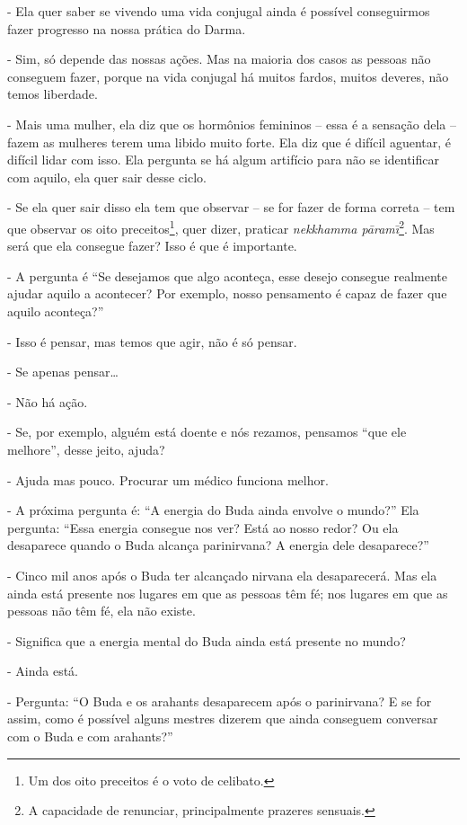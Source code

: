 - Ela quer saber se vivendo uma vida conjugal ainda é possível
conseguirmos fazer progresso na nossa prática do Darma.

- Sim, só depende das nossas ações. Mas na maioria dos casos as
pessoas não conseguem fazer, porque na vida conjugal há muitos fardos,
muitos deveres, não temos liberdade.

- Mais uma mulher, ela diz que os hormônios femininos – essa é a
sensação dela – fazem as mulheres terem uma libido muito forte. Ela diz
que é difícil aguentar, é difícil lidar com isso. Ela pergunta se há
algum artifício para não se identificar com aquilo, ela quer sair desse
ciclo.

- Se ela quer sair disso ela tem que observar – se for fazer de
forma correta – tem que observar os oito preceitos\footnote{Um dos oito
preceitos é o voto de celibato.}, quer dizer, praticar
\textit{nekkhamma p\=aram\=\i}\footnote{A capacidade de renunciar,
principalmente prazeres sensuais.}. Mas será que ela consegue fazer?
Isso é que é importante.

- A pergunta é “Se desejamos que algo aconteça, esse desejo
consegue realmente ajudar aquilo a acontecer? Por exemplo, nosso
pensamento é capaz de fazer que aquilo aconteça?”

- Isso é pensar, mas temos que agir, não é só pensar.

- Se apenas pensar…

- Não há ação.

- Se, por exemplo, alguém está doente e nós rezamos, pensamos “que
ele melhore”, desse jeito, ajuda?

- Ajuda mas pouco. Procurar um médico funciona melhor.

- A próxima pergunta é: “A energia do Buda ainda envolve o mundo?”
Ela pergunta: “Essa energia consegue nos ver? Está ao nosso redor? Ou
ela desaparece quando o Buda alcança parinirvana? A energia dele
desaparece?”

- Cinco mil anos após o Buda ter alcançado nirvana ela
desaparecerá. Mas ela ainda está presente nos lugares em que as pessoas
têm fé; nos lugares em que as pessoas não têm fé, ela não existe.

- Significa que a energia mental do Buda ainda está presente no
mundo?

- Ainda está.

- Pergunta: “O Buda e os arahants desaparecem após o parinirvana?
E se for assim, como é possível alguns mestres dizerem que ainda
conseguem conversar com o Buda e com arahants?”

